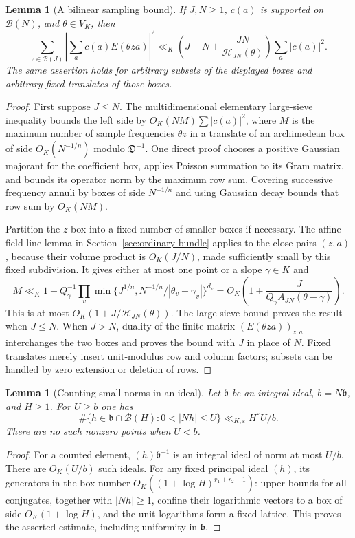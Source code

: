 \documentclass[11pt,reqno]{amsart}
\numberwithin{equation}{section}
\newtheorem{lemma}[theorem]{Lemma}
\theoremstyle{definition}
\begin{document}
\begin{lemma}[A bilinear sampling bound]
\label{lem:g789-bilinear}
If $J,N\ge1$, $c(a)$ is supported on $\mathcal B(N)$, and
$\theta\in V_K$, then
\[
 \sum_{z\in\mathcal B(J)}
       \left|\sum_a c(a)E(\theta za)\right|^2
 \ll_K\left(J+N+\frac{JN}{\mathcal H_{JN}(\theta)}\right)
                         \sum_a|c(a)|^2.
\]
The same assertion holds for arbitrary subsets of the displayed
boxes and arbitrary fixed translates of those boxes.
\end{lemma}
\begin{proof}
First suppose $J\le N$. The multidimensional elementary large-sieve
inequality bounds the left side by $O_K(NM)\sum|c(a)|^2$, where $M$
is the maximum number of sample frequencies $\theta z$ in a translate
of an archimedean box of side $O_K(N^{-1/n})$ modulo
$\mathfrak D^{-1}$. One direct proof chooses a positive Gaussian
majorant for the coefficient box, applies Poisson summation to its
Gram matrix, and bounds its operator norm by the maximum row sum.
Covering successive frequency annuli by boxes of side $N^{-1/n}$
and using Gaussian decay bounds that row sum by $O_K(NM)$.

Partition the $z$ box into a fixed number of smaller boxes if
necessary. The affine field-line lemma in Section~\ref{sec:ordinary-bundle}
applies to the close pairs $(z,a)$, because their volume product is
$O_K(J/N)$, made sufficiently small by this fixed subdivision.
It gives either at most one point or a slope $\gamma\in K$ and
\[
 M\ll_K1+Q_\gamma^{-1}
       \prod_v\min\{J^{1/n},N^{-1/n}/|\theta_v-\gamma_v|\}^{d_v}
 =O_K\left(1+\frac{J}{Q_\gamma A_{JN}(\theta-\gamma)}\right).
\]
This is at most $O_K(1+J/\mathcal H_{JN}(\theta))$.
The large-sieve bound proves the result when $J\le N$.
When $J>N$, duality of the finite matrix
$(E(\theta za))_{z,a}$ interchanges the two boxes and proves the
bound with $J$ in place of $N$. Fixed translates merely insert
unit-modulus row and column factors; subsets can be handled by
zero extension or deletion of rows.
\end{proof}

\begin{lemma}[Counting small norms in an ideal]
\label{lem:g789-smallnorm}
Let $\mathfrak b$ be an integral ideal, $b=N\mathfrak b$, and
$H\ge1$. For $U\ge b$ one has
\[
 \#\{h\in\mathfrak b\cap\mathcal B(H):0<|Nh|\le U\}
       \ll_{K,\varepsilon}H^\varepsilon U/b.
\]
There are no such nonzero points when $U<b$.
\end{lemma}
\begin{proof}
For a counted element, $(h)\mathfrak b^{-1}$ is an integral ideal
of norm at most $U/b$. There are $O_K(U/b)$ such ideals.
For any fixed principal ideal $(h)$, its generators in the box
number $O_K((1+\log H)^{r_1+r_2-1})$: upper bounds for all conjugates,
together with $|Nh|\ge1$, confine their logarithmic vectors to a box
of side $O_K(1+\log H)$, and the unit logarithms form a fixed lattice.
This proves the asserted estimate, including uniformity in
$\mathfrak b$.
\end{proof}
\end{document}
